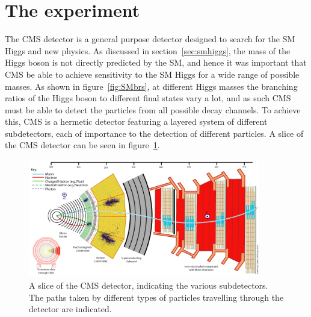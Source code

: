 \section{The \CMS experiment}
\label{sec:CMSInDetail}

The CMS detector is a general purpose detector designed to search for the
\ac{SM} Higgs and new physics. As discussed in section~\ref{sec:smhiggs}, the
mass of the Higgs boson is not directly predicted by the \ac{SM}, and hence it
was important that CMS be able to achieve sensitivity to the \ac{SM} Higgs for a
wide range of possible masses. As shown in figure~\ref{fig:SMbrs}, at different
Higgs masses the branching ratios of the Higgs boson to different final states
vary a lot, and as such CMS must be able to detect the particles from all
possible decay channels. To achieve this, CMS is a hermetic detector featuring
a layered system of different subdetectors, each of importance to the detection
of different particles. A slice of the CMS detector can be seen in
figure~\ref{fig:CMSslice}.

\begin{figure}[htbp]
   \includegraphics[width=0.9\textwidth]{plots/detector/CMS_Slice.png}
\caption{A slice of the CMS detector, indicating the various subdetectors. The
paths taken by different types of particles travelling through the detector are
indicated.}
\label{fig:CMSslice}
\end{figure}


